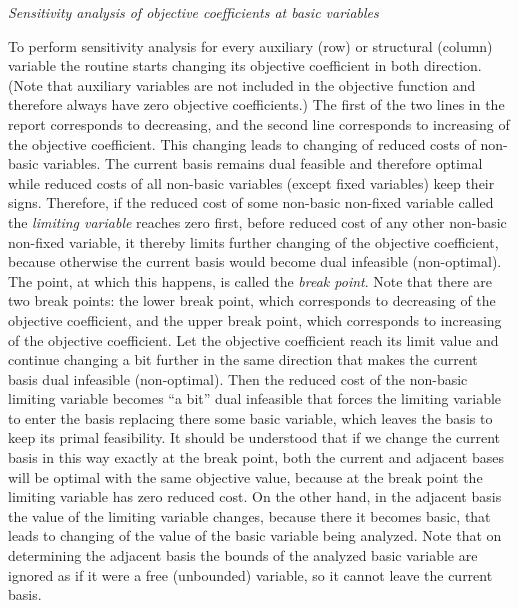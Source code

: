 \bigskip

\noindent
{\it Sensitivity analysis of objective coefficients at basic variables}

\medskip

\noindent
To perform sensitivity analysis for every auxiliary (row) or structural
(column) variable the routine starts changing its objective coefficient
in both direction. (Note that auxiliary variables are not included in
the objective function and therefore always have zero objective
coefficients.) The first of the two lines in the report corresponds to
decreasing, and the second line corresponds to increasing of the
objective coefficient. This changing leads to changing of reduced costs
of non-basic variables. The current basis remains dual feasible and
therefore optimal while reduced costs of all non-basic variables
(except fixed variables) keep their signs. Therefore, if the reduced
cost of some non-basic non-fixed variable called the {\it limiting
variable} reaches zero first, before reduced cost of any other
non-basic non-fixed variable, it thereby limits further changing of the
objective coefficient, because otherwise the current basis would become
dual infeasible (non-optimal). The point, at which this happens, is
called the {\it break point}. Note that there are two break points: the
lower break point, which corresponds to decreasing of the objective
coefficient, and the upper break point, which corresponds to increasing
of the objective coefficient. Let the objective coefficient reach its
limit value and continue changing a bit further in the same direction
that makes the current basis dual infeasible (non-optimal). Then the
reduced cost of the non-basic limiting variable becomes ``a bit'' dual
infeasible that forces the limiting variable to enter the basis
replacing there some basic variable, which leaves the basis to keep its
primal feasibility. It should be understood that if we change the
current basis in this way exactly at the break point, both the current
and adjacent bases will be optimal with the same objective value,
because at the break point the limiting variable has zero reduced cost.
On the other hand, in the adjacent basis the value of the limiting
variable changes, because there it becomes basic, that leads to
changing of the value of the basic variable being analyzed. Note that
on determining the adjacent basis the bounds of the analyzed basic
variable are ignored as if it were a free (unbounded) variable, so it
cannot leave the current basis.

